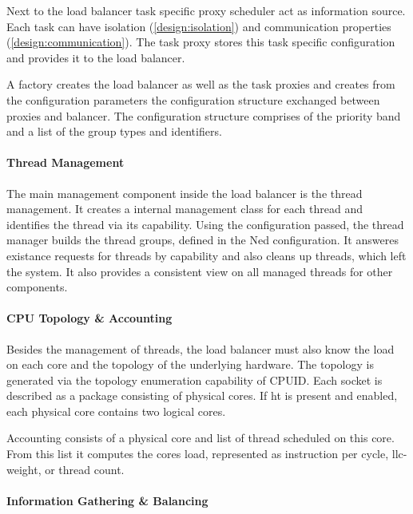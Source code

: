 Next to the load balancer task specific proxy scheduler act as information
source.
Each task can have isolation (\ref{design:isolation}) and communication
properties (\ref{design:communication}).
The task proxy stores this task specific configuration and provides it to the
load balancer.

A factory creates the load balancer as well as the task proxies and creates
from the configuration parameters the configuration structure exchanged between
proxies and balancer.
The configuration structure comprises of the priority band and a list of
the group types and identifiers.


\paragraph{Thread Management}
The main management component inside the load balancer is the thread
management.
It creates a internal management class for each thread and identifies the
thread via its capability.
Using the configuration passed, the thread manager builds the thread groups,
defined in the Ned configuration.
It answeres existance requests for threads by capability and also cleans up
threads, which left the system.
It also provides a consistent view on all managed threads for other components.


\paragraph{CPU Topology \& Accounting}
Besides the management of threads, the load balancer must also know the load on
each core and the topology of the underlying hardware.
The topology is generated via the topology enumeration capability of CPUID.
Each socket is described as a package consisting of physical cores.
If \gls{ht} is present and enabled, each physical core contains two logical
cores.

Accounting consists of a physical core and list of thread scheduled on this
core.
From this list it computes the cores load, represented as instruction
per cycle, \gls{llc}-weight, or thread count.


\paragraph{Information Gathering \& Balancing}




